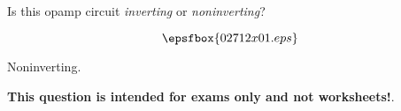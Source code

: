 

Is this opamp circuit {\it inverting} or {\it noninverting}?

$$\epsfbox{02712x01.eps}$$







Noninverting.







{\bf This question is intended for exams only and not worksheets!}.




